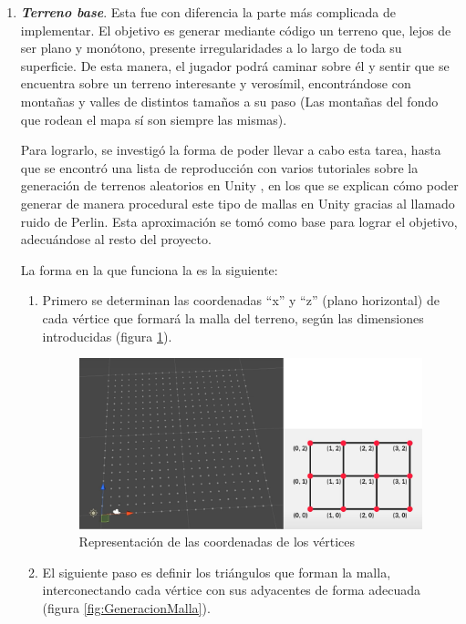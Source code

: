 \begin{enumerate}
  \item \textbf{\textit{Terreno base}}. Esta fue con diferencia la parte más complicada de implementar. El objetivo es generar mediante código un terreno que, lejos de ser plano y monótono, presente irregularidades a lo largo de toda su superficie. De esta manera, el jugador podrá caminar sobre él y sentir que se encuentra sobre un terreno interesante y verosímil, encontrándose con montañas y valles de distintos tamaños a su paso (Las montañas del fondo que rodean el mapa sí son siempre las mismas).
  
  Para lograrlo, se investigó la forma de poder llevar a cabo esta tarea, hasta que se encontró una lista de reproducción con varios tutoriales sobre la generación de terrenos aleatorios en Unity \cite{wiki:TerrainGeneration}, en los que se explican cómo poder generar de manera procedural este tipo de mallas en Unity gracias al llamado ruido de Perlin. Esta aproximación se tomó como base para lograr el objetivo, adecuándose al resto del proyecto.
  
  La forma en la que funciona la es la siguiente:
    \begin{enumerate}
    \item Primero se determinan las coordenadas ``x'' y ``z'' (plano horizontal) de cada vértice que formará la malla del terreno, según las dimensiones introducidas (figura \ref{fig:CoordenadasVertices}).
    
    \begin{figure}[h]
	\centering
	\includegraphics[scale=0.4]{img/verticesCoordinates.png}
	\caption{Representación de las coordenadas de los vértices}
	\label{fig:CoordenadasVertices}
    \end{figure}
    \item El siguiente paso es definir los triángulos que forman la malla, interconectando cada vértice con sus adyacentes de forma adecuada (figura \ref{fig:GeneracionMalla}).
    

\end{enumerate}
\end{enumerate}
